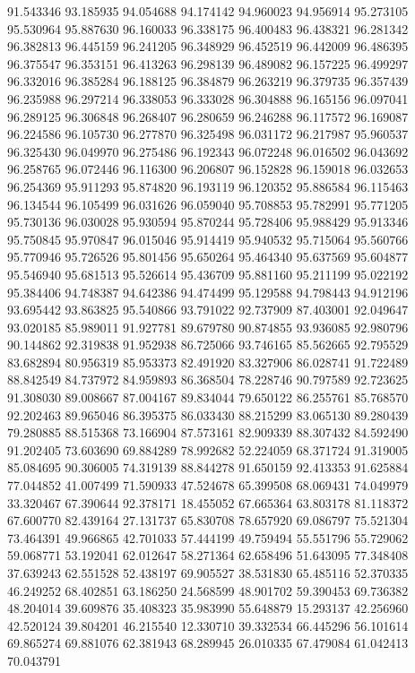 91.543346
93.185935
94.054688
94.174142
94.960023
94.956914
95.273105
95.530964
95.887630
96.160033
96.338175
96.400483
96.438321
96.281342
96.382813
96.445159
96.241205
96.348929
96.452519
96.442009
96.486395
96.375547
96.353151
96.413263
96.298139
96.489082
96.157225
96.499297
96.332016
96.385284
96.188125
96.384879
96.263219
96.379735
96.357439
96.235988
96.297214
96.338053
96.333028
96.304888
96.165156
96.097041
96.289125
96.306848
96.268407
96.280659
96.246288
96.117572
96.169087
96.224586
96.105730
96.277870
96.325498
96.031172
96.217987
95.960537
96.325430
96.049970
96.275486
96.192343
96.072248
96.016502
96.043692
96.258765
96.072446
96.116300
96.206807
96.152828
96.159018
96.032653
96.254369
95.911293
95.874820
96.193119
96.120352
95.886584
96.115463
96.134544
96.105499
96.031626
96.059040
95.708853
95.782991
95.771205
95.730136
96.030028
95.930594
95.870244
95.728406
95.988429
95.913346
95.750845
95.970847
96.015046
95.914419
95.940532
95.715064
95.560766
95.770946
95.726526
95.801456
95.650264
95.464340
95.637569
95.604877
95.546940
95.681513
95.526614
95.436709
95.881160
95.211199
95.022192
95.384406
94.748387
94.642386
94.474499
95.129588
94.798443
94.912196
93.695442
93.863825
95.540866
93.791022
92.737909
87.403001
92.049647
93.020185
85.989011
91.927781
89.679780
90.874855
93.936085
92.980796
90.144862
92.319838
91.952938
86.725066
93.746165
85.562665
92.795529
83.682894
80.956319
85.953373
82.491920
83.327906
86.028741
91.722489
88.842549
84.737972
84.959893
86.368504
78.228746
90.797589
92.723625
91.308030
89.008667
87.004167
89.834044
79.650122
86.255761
85.768570
92.202463
89.965046
86.395375
86.033430
88.215299
83.065130
89.280439
79.280885
88.515368
73.166904
87.573161
82.909339
88.307432
84.592490
91.202405
73.603690
69.884289
78.992682
52.224059
68.371724
91.319005
85.084695
90.306005
74.319139
88.844278
91.650159
92.413353
91.625884
77.044852
41.007499
71.590933
47.524678
65.399508
68.069431
74.049979
33.320467
67.390644
92.378171
18.455052
67.665364
63.803178
81.118372
67.600770
82.439164
27.131737
65.830708
78.657920
69.086797
75.521304
73.464391
49.966865
42.701033
57.444199
49.759494
55.551796
55.729062
59.068771
53.192041
62.012647
58.271364
62.658496
51.643095
77.348408
37.639243
62.551528
52.438197
69.905527
38.531830
65.485116
52.370335
46.249252
68.402851
63.186250
24.568599
48.901702
59.390453
69.736382
48.204014
39.609876
35.408323
35.983990
55.648879
15.293137
42.256960
42.520124
39.804201
46.215540
12.330710
39.332534
66.445296
56.101614
69.865274
69.881076
62.381943
68.289945
26.010335
67.479084
61.042413
70.043791
